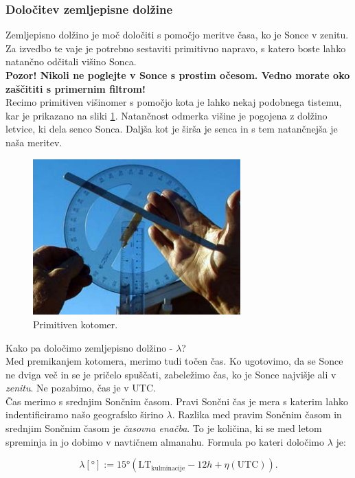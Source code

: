 \subsubsection{Določitev zemljepisne dolžine}
Zemljepisno dolžino je moč določiti s pomočjo meritve časa, ko je Sonce v zenitu. Za izvedbo te vaje je potrebno sestaviti primitivno napravo, s katero boste lahko natančno odčitali višino Sonca.\\[2mm]
%
\textbf{Pozor! Nikoli ne poglejte v Sonce s prostim očesom. Vedno morate oko zaščititi s primernim filtrom!}\\[2mm]
%
Recimo primitiven višinomer s pomočjo kota je lahko nekaj podobnega tistemu, kar je prikazano na sliki \ref{fig:v_cas_kotomer}. Natančnost odmerka višine je pogojena z dolžino letvice, ki dela senco Sonca. Daljša kot je širša je senca in s tem natančnejša je naša meritev. 
%
\begin{figure}[!htbp]
	\centering \includegraphics[width=8cm]{Vaje/CasPomorstvo/figs/kotomer.jpg}
	\caption{Primitiven kotomer.}
	\label{fig:v_cas_kotomer}
\end{figure}
%
Kako pa določimo zemljepisno dolžino - $\lambda$?\\[2mm]
%
Med premikanjem kotomera, merimo tudi točen čas. Ko ugotovimo, da se Sonce ne dviga več in se je pričelo spuščati, zabeležimo čas, ko je Sonce najvišje ali v \emph{zenitu}. Ne pozabimo, čas je v UTC.\\[2mm]
%
Čas merimo s srednjim Sončnim časom. Pravi Sončni čas je mera s katerim lahko indentificiramo našo geografsko širino $\lambda$. Razlika med pravim Sončnim časom in srednjim Sončnim časom je \emph{časovna enačba}. To je količina, ki se med letom spreminja in jo dobimo v navtičnem almanahu. Formula po kateri določimo $\lambda$ je:

\begin{equation}
\label{eq:v_cas_lambda} 
\lambda[\si{\degree}] := 15\si{\degree} \left( \text{LT}_{\text{kulminacije}} - 12h + \eta(\text{UTC}) \right).
\end{equation}


